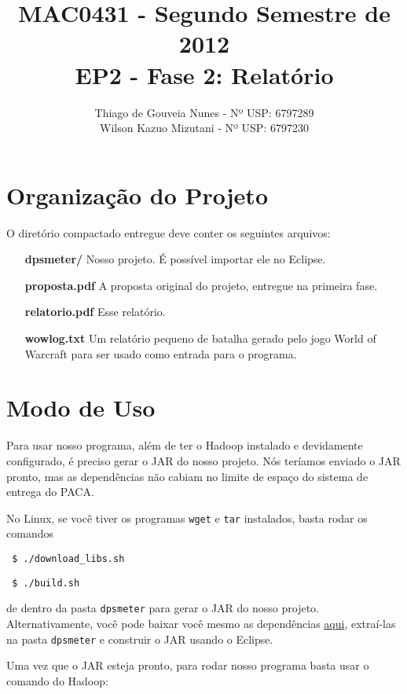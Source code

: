 \documentclass[a4paper,11pt]{article}
\title{MAC0431 - Segundo Semestre de 2012 \\
       EP2 - Fase 2: Relatório}
\author{Thiago de Gouveia Nunes - Nº USP: 6797289 \\
        Wilson Kazuo Mizutani - Nº USP: 6797230}
\begin{document}
\maketitle

\section{Organização do Projeto}

  O diretório compactado entregue deve conter os seguintes arquivos:
  
  \begin{itemize}
    \item[\textbf{dpsmeter/}]
      Nosso projeto. É possível importar ele no Eclipse.
    \item[\textbf{proposta.pdf}]
      A proposta original do projeto, entregue na primeira fase.
    \item[\textbf{relatorio.pdf}]
      Esse relatório.
    \item[\textbf{wowlog.txt}]
      Um relatório pequeno de batalha gerado pelo jogo World of Warcraft para
      ser usado como entrada para o programa.
  \end{itemize}
  
\section{Modo de Uso}

  Para usar nosso programa, além de ter o Hadoop instalado e devidamente
  configurado, é preciso gerar o JAR do nosso projeto. Nós teríamos enviado o
  JAR pronto, mas as dependências não cabiam no limite de espaço do sistema de
  entrega do PACA.
  
  No Linux, se você tiver os programas \verb$wget$ e \verb$tar$ instalados,
  basta rodar os comandos
  
  \begin{verbatim} $ ./download_libs.sh \end{verbatim}
  \begin{verbatim} $ ./build.sh \end{verbatim}
  
  de dentro da pasta \verb$dpsmeter$ para gerar o JAR do nosso projeto.
  Alternativamente, você pode baixar você mesmo as dependências
  \href{http://www.linux.ime.usp.br/~wilsonkmizutani/mac0431/ep2/}{aqui},
  extraí-las na pasta \verb$dpsmeter$ e construir o JAR usando o Eclipse.
  
  Uma vez que o JAR esteja pronto, para rodar nosso programa basta usar o
  comando do Hadoop:
  
\end{document}

